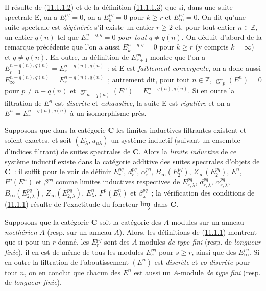 \begin{env}[11.1.6]
\label{0.11.1.6-fr}
Il résulte de (\hyperref[0.11.1.1.2-fr]{11.1.1.2}) et de la définition
(\hyperref[0.11.1.1.3-fr]{11.1.1.3}) que si, dans une suite spectrale E, on a
$E_r^{pq}=0$, on a $E_k^{pq}=0$ pour $k\geq r$ et $E_\infty^{pq}=0$. On dit
qu'une suite spectrale est \emph{dégénérée} s'il existe un entier $r\geq2$ et,
pour tout entier $n\in\mathbb Z$, un entier $q(n)$ tel que
$E_r^{n-q,q}=0$ \emph{pour tout} $q\ne q(n)$. On déduit d'abord de la remarque
précédente que l'on a aussi $E_k^{n-q,q}=0$ pour $k\geq r$ (y compris
$k=\infty$) et $q\ne q(n)$. En outre, la définition de $E_{r+1}^{pq}$ montre
que l'on a
$E_{r+1}^{n-q(n),q(n)}=E_r^{n-q(n),q(n)}$~; si E est \emph{faiblement convergente},
on a donc aussi
$E_\infty^{n-q(n),q(n)}=E_r^{n-q(n),q(n)}$~; autrement dit, pour tout
$n\in\mathbb Z$, $\operatorname{gr}_p(E^n)=0$ pour $p\ne n-q(n)$ et
$\operatorname{gr}_{n-q(n)}(E^n)=E_r^{n-q(n),q(n)}$. Si en outre la filtration
de $E^n$ est \emph{discrète} et \emph{exhaustive}, la suite E est \emph{régulière} et on a
$E^n=E_r^{n-q(n),q(n)}$ à un isomorphisme près.
\end{env}

\begin{env}[11.1.7]
\label{0.11.1.7-fr}
Supposons que dans la catégorie $\boldsymbol{C}$ les limites inductives filtrantes
existent et soient exactes, et soit $(E_\lambda,u_{\mu\lambda})$ un système
inductif (suivant un ensemble d'indices filtrant) de suites spectrales de
$\boldsymbol{C}$. Alors la \emph{limite inductive} de ce système inductif existe
dans la catégorie additive des suites spectrales d'objets de $\boldsymbol{C}$~:
il suffit pour le voir de définir $E_r^{pq}$, $d_r^{pq}$, $\alpha_r^{pq}$,
$B_\infty(E_2^{pq})$, $Z_\infty(E_2^{pq})$, $E^n$, $F^p(E^n)$ et
$\beta^{pq}$ comme limites inductives respectives de $E_{r,\lambda}^{pq}$,
$d_{r,\lambda}^{pq}$, $\alpha_{r,\lambda}^{pq}$,
$B_\infty(E_{2,\lambda}^{pq})$, $Z_\infty(E_{2,\lambda}^{pq})$,
$E_\lambda^n$, $F^p(E_\lambda^n)$ et $\beta_\lambda^{pq}$~; la vérification
des conditions de (\hyperref[0.11.1.1-fr]{11.1.1}) résulte de l'exactitude du
foncteur $\varinjlim$ dans $\boldsymbol{C}$.
\end{env}

\begin{remark}[11.1.8]
\label{0.11.1.8-fr}
Supposons que la catégorie $\boldsymbol{C}$ soit la catégorie des $A$-modules sur
un anneau \emph{noethérien} $A$ (resp. sur un anneau $A$). Alors, les
définitions de (\hyperref[0.11.1.1-fr]{11.1.1}) montrent que si pour un $r$
donné, les $E_r^{pq}$ sont des $A$-modules \emph{de type fini} (resp. de
\emph{longueur finie}), il en est de même de tous les modules $E_s^{pq}$ pour
$s\geq r$, ainsi que des $E_\infty^{pq}$. Si en outre la filtration de
l'aboutissement $(E^n)$ est \emph{discrète} et \emph{co-discrète} pour tout $n$, on en
conclut que chacun des $E^n$ est aussi un $A$-module \emph{de type fini}
(resp. de \emph{longueur finie}).
\end{remark}

